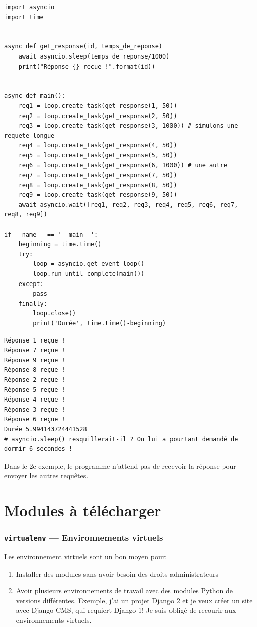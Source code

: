 \documentclass[a4paper, 10pt]{article}
\begin{document}
\begin{verbatim}
import asyncio
import time


async def get_response(id, temps_de_reponse)
    await asyncio.sleep(temps_de_reponse/1000)
    print("Réponse {} reçue !".format(id))


async def main():
    req1 = loop.create_task(get_response(1, 50))
    req2 = loop.create_task(get_response(2, 50))
    req3 = loop.create_task(get_response(3, 1000)) # simulons une requete longue
    req4 = loop.create_task(get_response(4, 50))
    req5 = loop.create_task(get_response(5, 50))
    req6 = loop.create_task(get_response(6, 1000)) # une autre
    req7 = loop.create_task(get_response(7, 50))
    req8 = loop.create_task(get_response(8, 50))
    req9 = loop.create_task(get_response(9, 50))
    await asyncio.wait([req1, req2, req3, req4, req5, req6, req7, req8, req9])

if __name__ == '__main__':
    beginning = time.time()
    try:
        loop = asyncio.get_event_loop()
        loop.run_until_complete(main())
    except:
        pass
    finally:
        loop.close()
        print('Durée', time.time()-beginning)

\end{verbatim}
\begin{verbatim}
Réponse 1 reçue !
Réponse 7 reçue !
Réponse 9 reçue !
Réponse 8 reçue !
Réponse 2 reçue !
Réponse 5 reçue !
Réponse 4 reçue !
Réponse 3 reçue !
Réponse 6 reçue !
Durée 5.994143724441528
# asyncio.sleep() resquillerait-il ? On lui a pourtant demandé de dormir 6 secondes !
\end{verbatim}
Dans le 2e exemple, le programme n'attend pas de recevoir la réponse pour envoyer les autres requêtes.

\part{Modules à télécharger}
\section{\texttt{virtualenv} --- Environnements virtuels}\label{virtualenv}

Les environnement virtuels  sont un bon moyen pour:
\begin{enumerate}
	\item Installer des modules sans avoir besoin des droits administrateurs
	\item Avoir plusieurs environnements de travail avec des modules Python de versions différentes. Exemple, j'ai un projet Django 2 et je veux créer un site avec Django-CMS, qui requiert Django 1! Je suis obligé de recourir aux environnements virtuels.
\end{enumerate}
\end{document}
